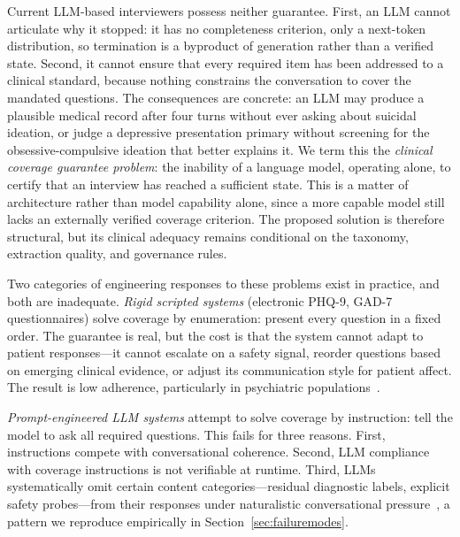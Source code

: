 \documentclass[conference]{IEEEtran}
\begin{document}
Current LLM-based interviewers possess neither guarantee. First, an LLM
cannot articulate why it stopped: it has no completeness
criterion, only a next-token distribution, so termination is a
byproduct of generation rather than a verified state. Second, it cannot
ensure that every required item has been addressed to a clinical
standard, because nothing constrains the conversation to cover the
mandated questions. The consequences are concrete: an LLM may produce a
plausible medical record after four turns without ever asking about
suicidal ideation, or judge a depressive presentation primary without
screening for the obsessive-compulsive ideation that better explains
it.  We term this the \emph{clinical coverage guarantee problem}: the
inability of a language model, operating alone, to certify that an
interview has reached a sufficient state. This is a matter of
architecture rather than model capability alone, since a more capable
model still lacks an externally verified coverage criterion. The proposed
solution is therefore structural, but its clinical adequacy remains
conditional on the taxonomy, extraction quality, and governance rules.

Two categories of engineering responses to these problems exist in practice, and both are inadequate. \textit{Rigid scripted systems} (electronic PHQ-9, GAD-7 questionnaires) solve coverage by enumeration: present every question in a fixed order. The guarantee is real, but the cost is that the system cannot adapt to patient responses---it cannot escalate on a safety signal, reorder questions based on emerging clinical evidence, or adjust its communication style for patient affect. The result is low adherence, particularly in psychiatric populations~\cite{torous2020dropout}.

\textit{Prompt-engineered LLM systems} attempt to solve coverage by instruction: tell the model to ask all required questions. This fails for three reasons. First, instructions compete with conversational coherence. Second, LLM compliance with coverage instructions is not verifiable at runtime. Third, LLMs systematically omit certain content categories---residual diagnostic labels, explicit safety probes---from their responses under naturalistic conversational pressure~\cite{ni2026disentangling}, a pattern we reproduce empirically in Section~\ref{sec:failuremodes}.
\end{document}
